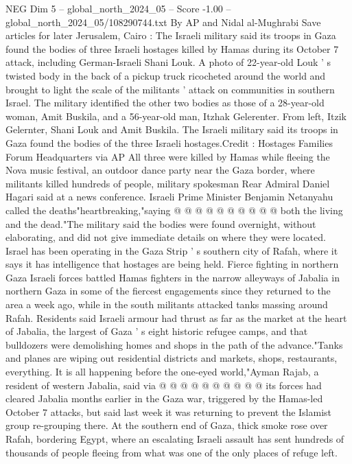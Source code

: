 \begin{textsample}{NEG Dim 5 – global\_north\_2024\_05 – Score -1.00 – global\_north\_2024\_05/108290744.txt}  \label{ex:f5_neg_282}
By AP and Nidal al-Mughrabi Save articles for later Jerusalem, Cairo : The Israeli military said its troops in Gaza found the bodies of three Israeli hostages killed by Hamas during its October 7 attack, including German-Israeli Shani Louk.
A photo of 22-year-old Louk ' s twisted body in the back of a pickup truck ricocheted around the world and brought to light the scale of the militants ' attack on communities in southern Israel.
The military identified the other two bodies as those of a 28-year-old woman, Amit Buskila, and a 56-year-old man, Itzhak Gelerenter.
From left, Itzik Gelernter, Shani Louk and Amit Buskila.
The Israeli military said its troops in Gaza found the bodies of the three Israeli hostages.Credit : Hostages Families Forum Headquarters via AP All three were killed by Hamas while fleeing the Nova music festival, an outdoor dance party near the Gaza border, where militants killed hundreds of people, military spokesman Rear Admiral Daniel Hagari said at a news conference.
Israeli Prime Minister Benjamin Netanyahu called the deaths"heartbreaking,"saying @ @ @ @ @ @ @ @ @ @ both the living and the dead."The military said the bodies were found overnight, without elaborating, and did not give immediate details on where they were located.
Israel has been operating in the Gaza Strip ' s southern city of Rafah, where it says it has intelligence that hostages are being held.
Fierce fighting in northern Gaza Israeli forces battled Hamas fighters in the narrow alleyways of Jabalia in northern Gaza in some of the fiercest engagements since they returned to the area a week ago, while in the south militants attacked tanks massing around Rafah.
Residents said Israeli armour had thrust as far as the market at the heart of Jabalia, the largest of Gaza ' s eight historic refugee camps, and that bulldozers were demolishing homes and shops in the path of the advance."Tanks and planes are wiping out residential districts and markets, shops, restaurants, everything.
It is all happening before the one-eyed world,"Ayman Rajab, a resident of western Jabalia, said via @ @ @ @ @ @ @ @ @ @ its forces had cleared Jabalia months earlier in the Gaza war, triggered by the Hamas-led October 7 attacks, but said last week it was returning to prevent the Islamist group re-grouping there.
At the southern end of Gaza, thick smoke rose over Rafah, bordering Egypt, where an escalating Israeli assault has sent hundreds of thousands of people fleeing from what was one of the only places of refuge left.

\end{textsample}
